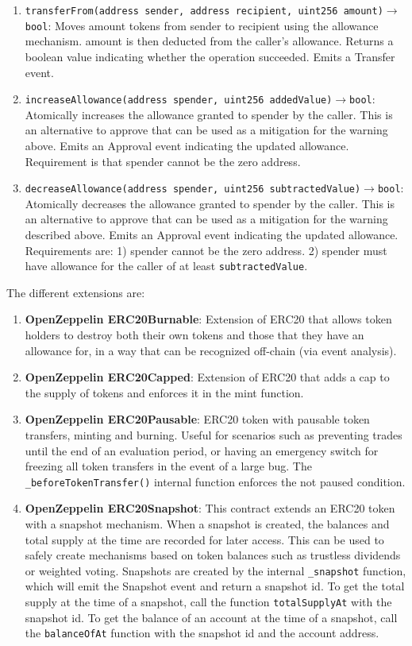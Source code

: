 \begin{enumerate}
\begin{enumerate}
	\item\verb|transferFrom(address sender, address recipient, uint256 amount)|$\rightarrow$\verb|bool|: Moves amount tokens from sender to recipient using the allowance mechanism. amount is then deducted from the caller’s allowance. Returns a boolean value indicating whether the operation succeeded. Emits a Transfer event.
	\item\verb|increaseAllowance(address spender, uint256 addedValue)|$\rightarrow$\verb|bool|: Atomically increases the allowance granted to spender by the caller. This is an alternative to approve that can be used as a mitigation for the warning above. Emits an Approval event indicating the updated allowance. Requirement is that spender cannot be the zero address.
	\item\verb|decreaseAllowance(address spender, uint256 subtractedValue)|$\rightarrow$\verb|bool|: Atomically decreases the allowance granted to spender by the caller. This is an alternative to approve that can be used as a mitigation for the warning described above. Emits an Approval event indicating the updated allowance. Requirements are: 1) spender cannot be the zero address. 2) spender must have allowance for the caller of at least \verb|subtractedValue|.
    \end{enumerate}

    The different extensions are:


    \begin{enumerate}
    \item\textbf{OpenZeppelin ERC20Burnable}: Extension of ERC20 that allows token holders to destroy both their own tokens and those that they have an allowance for, in a way that can be recognized off-chain (via event analysis).

    \item\textbf{OpenZeppelin ERC20Capped}: Extension of ERC20 that adds a cap to the supply of tokens and enforces it in the mint function.

    \item\textbf{OpenZeppelin ERC20Pausable}: ERC20 token with pausable token transfers, minting and burning. Useful for scenarios such as preventing trades until the end of an evaluation period, or having an emergency switch for freezing all token transfers in the event of a large bug. The \verb|_beforeTokenTransfer()| internal function enforces the not paused condition.

    \item\textbf{OpenZeppelin ERC20Snapshot}: This contract extends an ERC20 token with a snapshot mechanism. When a snapshot is created, the balances and total supply at the time are recorded for later access. This can be used to safely create mechanisms based on token balances such as trustless dividends or weighted voting. Snapshots are created by the internal \verb|_snapshot| function, which will emit the Snapshot event and return a snapshot id. To get the total supply at the time of a snapshot, call the function \verb|totalSupplyAt| with the snapshot id. To get the balance of an account at the time of a snapshot, call the \verb|balanceOfAt| function with the snapshot id and the account address.


\end{enumerate}
\end{enumerate}

